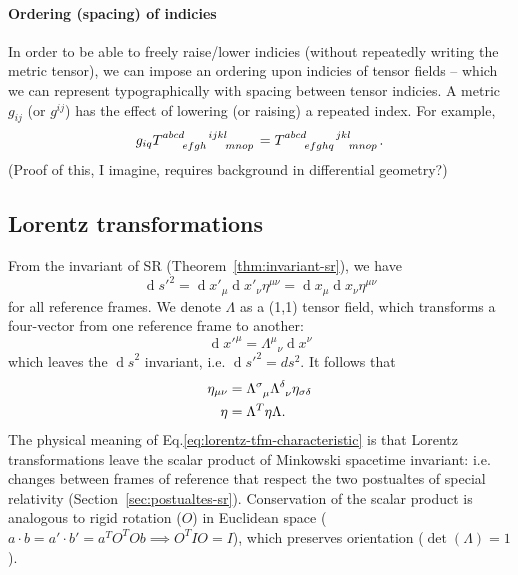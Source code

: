 \documentclass[11pt]{article}
\numberwithin{equation}{section}
\renewcommand{\d}[1]{\ensuremath{\operatorname{d}\!{#1}}}
\begin{document}
\paragraph{Ordering (spacing) of indicies} In order to be able to freely raise/lower indicies (without repeatedly writing the metric tensor), we can impose an ordering upon indicies of tensor fields -- which we can represent typographically with spacing between tensor indicies. A metric $g_{ij}$ (or $g^{ij}$) has the effect of lowering (or raising) a repeated index. For example,
\begin{equation}
g_{iq} \tensor{T}{^{abcd}_{efgh}^{ijkl}_{mnop}}  = \tensor{T}{^{abcd}_{efghq}^{jkl}_{mnop}}.
\end{equation}
(Proof of this, I imagine, requires background in differential geometry?)

\subsection{Lorentz transformations}
From the invariant of SR (Theorem~\ref{thm:invariant-sr}), we have
\begin{equation}
\d s'^2 = \d x'_\mu \d x'_\nu \eta^{\mu \nu} = \d x_\mu \d x_\nu \eta^{\mu \nu}
\end{equation}
for all reference frames. We denote $\Lambda$ as a (1,1) tensor field, which transforms a four-vector from one reference frame to another:
\begin{equation}
\d x'^\mu = \Lambda^\mu{}_{\nu} \d x ^\nu
\end{equation}
which leaves the $\d s^2$ invariant, i.e. $\d s'^2 = ds^2$. It follows that 
\begin{align}
\eta_{\mu \nu} &= \tensor{\Lambda}{^\sigma_\mu} \tensor{\Lambda}{^\delta_\nu} \eta_{\sigma \delta} \label{eq:lorentz-tfm-characteristic}\\
\eta &= \Lambda^T \eta \Lambda. \nonumber
\end{align}
The physical meaning of Eq.\eqref{eq:lorentz-tfm-characteristic} is that Lorentz transformations leave the scalar product of Minkowski spacetime invariant: i.e. changes between frames of reference that respect the two postualtes of special relativity (Section~\ref{sec:postualtes-sr}). Conservation of the scalar product is analogous to rigid rotation ($O$) in Euclidean space ($a \cdot b = a' \cdot b' = a^T O^T O b \implies O^T I O = I$), which preserves orientation ($\det(\Lambda)=1$).
\end{document}
